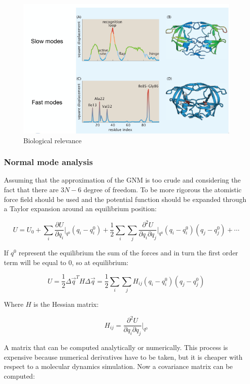 		\begin{figure}[H]
			\includegraphics[width=\textwidth]{biological-relevance}
			\caption{Biological relevance}
			\label{fig:biological-relevance}
		\end{figure}

		\subsubsection{Normal mode analysis}
		Assuming that the approximation of the GNM is too crude and considering the fact that there are $3N-6$ degree of freedom.
		To be more rigorous the atomistic force field should be used and the potential function should be expanded through a Taylor expansion around an equilibrium position:

		$$U = U_0 + \sum\limits_i\frac{\partial U}{\partial q_i}\biggr\rvert_{q^0}(q_i-q_i^0) + \frac{1}{2}\sum\limits_i\sum\limits_j\frac{\partial^2 U}{\partial q_i\partial q_j}\biggr\rvert_{q^0}(q_i-q_i^0)(q_j-q_j^0) + \cdots$$

		If $q^0$ represent the equilibrium the sum of the forces and in turn the first order term will be equal to $0$, so at equilibrium:

		$$U = \frac{1}{2}\Delta\vec{q}^TH\Delta\vec{q} = \frac{1}{2}\sum\limits_i\sum\limits_j H_{ij}(q_i-q_i^0)(q_j-q_j^0)$$

		Where $H$ is the Hessian matrix:

		$$H_{ij} = \frac{\partial^2 U}{\partial q_i\partial q_j}\biggr\rvert_{q^0}$$

		A matrix that can be computed analytically or numerically.
		This process is expensive because numerical derivatives have to be taken, but it is cheaper with respect to a molecular dynamics simulation.
		Now a covariance matrix can be computed:

